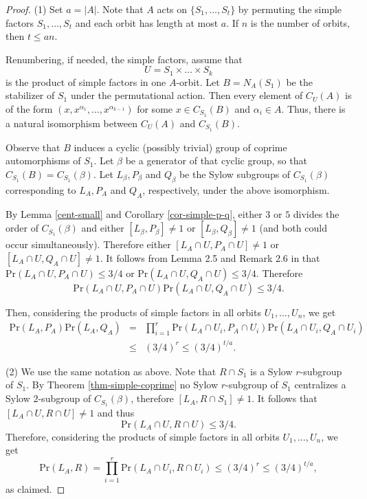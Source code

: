 \documentclass[12pt]{amsart}
\newcommand{\pr }{\mathrm{Pr} }
\newcommand{\LL }{L }
\begin{document}
\begin{proof} 
 
\noindent (1) Set $a=|A|$. Note that $A$ acts on $\{S_1,\dots, S_t\}$ by permuting the simple factors $S_1,\dots,S_t$ and each orbit has length at most $a$.
If $n$ is the number of orbits, then $t\le an$. 

Renumbering, if needed, the simple factors, assume that 
\[U=S_1\times\dots\times S_k\]
 is the product of simple factors in one $A$-orbit. Let $B=N_A(S_1)$ be the stabilizer of $S_1$ under the permutational action.
 Then every element of $C_U(A)$ is of the form $(x,x^{\alpha_1},\dots,x^{\alpha_{k-1}})$ for some $x\in C_{S_1}(B)$ and $\alpha_i\in A$. Thus, there is a natural isomorphism between $C_U(A)$ and $C_{S_1}(B)$.

Observe that $B$ induces a cyclic (possibly trivial) group of coprime automorphisms of $S_1$. Let $\beta$ be a generator of that cyclic group, so that 
 $C_{S_1}(B)=C_{S_1}(\beta)$. 
   Let $\LL_\beta,P_\beta$ and $ Q_\beta$ be the Sylow subgroups of $C_{S_1}(\beta)$ corresponding to $\LL_A,P_A$ and $ Q_A$, respectively, under the above isomorphism. 

  By Lemma \ref{cent-small} and Corollary \ref{cor-simple-p-q}, either $3$ or $5$ divides the order of $C_{S_1}(\beta)$ and either $[\LL_\beta,P_\beta]\ne 1$ or $[\LL_\beta,Q_\beta]\ne 1$ (and both could occur simultaneously). Therefore either $[\LL_A\cap U,P_A\cap U]\ne 1$ or $[\LL_A\cap U,Q_A\cap U]\ne 1$. It follows from Lemma 2.5 and Remark 2.6 in \cite{DLMS-finite} 
   that  $\pr (\LL_A\cap U,P_A\cap U) \le 3/4$ or  $\pr (\LL_A\cap U,Q_A\cap U) \le 3/4$. Therefore 
\[ \pr (\LL_A\cap U,P_A\cap U)\pr (\LL_A\cap U,Q_A\cap U)  \le 3/4.  \] 

Then, considering the products of simple factors in all orbits $U_1,\dots,U_n$, we get
\begin{eqnarray*}
\pr (\LL_A,P_A) \pr(\LL_A,Q_A) &=& \prod_{i=1}^{r} \pr (\LL_A\cap  U_i,P_A\cap  U_i) \pr(\LL_A\cap  U_i,Q_A\cap  U_i) \\
&\le& (3/4)^r \le (3/4)^{t/a}.
\end{eqnarray*}

\noindent (2) We use the same notation as above. Note that 
 $R\cap S_1$  is a Sylow $r$-subgroup of $S_1$.  By Theorem  \ref{thm-simple-coprime} no Sylow $r$-subgroup of $S_1$ centralizes a Sylow $2$-subgroup of $C_{S_1}(\beta)$, 
 therefore $[\LL_A,R\cap S_1]\ne 1$. It follows that $[\LL_A\cap U,R\cap U]\ne 1$ and thus
\[ \pr (\LL_A\cap U,R\cap U ) \le 3/4. \]
Therefore, considering the products of simple factors in all orbits $U_1,\dots,U_n$, we get 
\[\pr (\LL_A,R) =\prod_{i=1}^{r} \pr (\LL_A\cap  U_i,R\cap  U_i) \le  (3/4)^r \le  (3/4)^{t/a}, \]
as claimed. 
\end {proof} 
\end{document}
